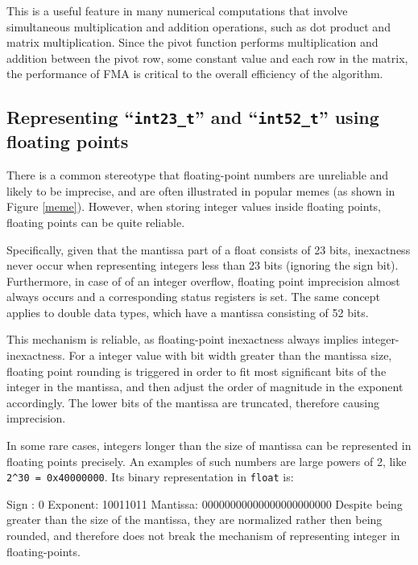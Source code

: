 \documentclass[logo,bsc,singlespacing,parskip]{infthesis}
\newcommand{\dtfloat}{\texttt{float} }
\newenvironment{VerbatimCompact}
  {\vspace*{-2.5mm}\VerbatimEnvironment
   \par\Verbatim}
  {\endVerbatim\vspace*{-2.4mm}}
\begin{document}
This is a useful feature in many numerical computations that involve
simultaneous multiplication and addition operations, such as dot product and
matrix multiplication. Since the pivot function performs multiplication and
addition between the pivot row, some constant value and each row in the matrix,
the performance of FMA is critical to the overall efficiency of the algorithm. 

\subsection{Representing ``\texttt{int23\_t}'' and ``\texttt{int52\_t}'' using
floating points}
\label{sec:fpe2}

There is a common stereotype that floating-point numbers are unreliable and
likely to be imprecise, and are often illustrated in popular memes (as shown in
Figure \ref{meme}). However, when storing integer values inside floating points, 
floating points can be quite reliable. 

Specifically, given that the mantissa part of a float consists of 23 bits,
inexactness never occur when representing integers less than 23 bits (ignoring
the sign bit). Furthermore, in case of of an integer overflow, floating point
imprecision almost always occurs and a corresponding status registers is set.
The same concept applies to double data types, which have a mantissa consisting
of 52 bits.

This mechanism is reliable, as floating-point inexactness always implies
integer-inexactness. For a integer value with bit width greater than the
mantissa size, floating point rounding is triggered in order to fit most
significant bits of the integer in the mantissa, and then adjust the order of
magnitude in the exponent accordingly. The lower bits of the mantissa are
truncated, therefore causing imprecision. 

In some rare cases, integers longer than the size of mantissa can be represented
in floating points precisely. An examples of such numbers are large powers of 2,
like \texttt{2\^{}30 = 0x40000000}. Its binary representation in \dtfloat
is:
\begin{VerbatimCompact}
Sign    : 0
Exponent: 10011011
Mantissa: 00000000000000000000000
\end{VerbatimCompact}
Despite being greater than the size of
the mantissa, they are normalized rather then being rounded, and therefore does
not break the mechanism of representing integer in floating-points.
\end{document}
